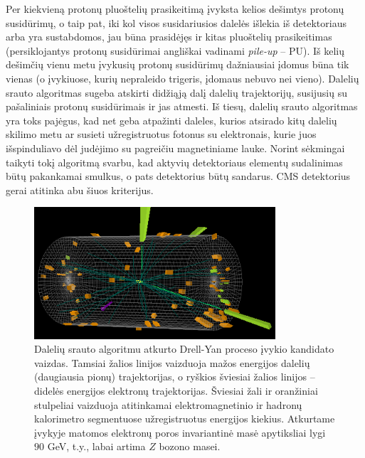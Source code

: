 \documentclass[a4paper, 12pt, oneside]{article}
\begin{document}
Per kiekvieną protonų pluoštelių prasikeitimą įvyksta kelios dešimtys protonų susidūrimų, o taip pat, iki kol
visos susidariusios dalelės išlekia iš detektoriaus arba yra sustabdomos, jau būna prasidėjęs ir kitas pluoštelių
prasikeitimas (persiklojantys protonų susidūrimai angliškai vadinami \textit{pile-up} -- PU).
Iš kelių dešimčių vienu metu įvykusių protonų susidūrimų dažniausiai įdomus būna tik vienas (o įvykiuose, kurių
nepraleido trigeris, įdomaus nebuvo nei vieno).
Dalelių srauto algoritmas sugeba atskirti didžiąją dalį dalelių trajektorijų, susijusių su pašaliniais
protonų susidūrimais ir jas atmesti.
Iš tiesų, dalelių srauto algoritmas yra toks pajėgus, kad net geba atpažinti daleles, kurios atsirado kitų dalelių skilimo metu
ar susieti užregistruotus fotonus su elektronais, kurie juos išspinduliavo dėl judėjimo su pagreičiu magnetiniame lauke.
Norint sėkmingai taikyti tokį algoritmą svarbu, kad aktyvių detektoriaus elementų sudalinimas būtų pakankamai smulkus,
o pats detektorius būtų sandarus.
CMS detektorius gerai atitinka abu šiuos kriterijus.

\begin{figure}[t]
	\includegraphics[width=0.8\textwidth]{Event.png}
	\caption{\label{fig:Event}
		Dalelių srauto algoritmu atkurto Drell-Yan proceso įvykio kandidato vaizdas.
		Tamsiai žalios linijos vaizduoja mažos energijos dalelių (daugiausia pionų) trajektorijas,
		o ryškios šviesiai žalios linijos -- didelės energijos elektronų trajektorijas.
		Šviesiai žali ir oranžiniai stulpeliai vaizduoja atitinkamai elektromagnetinio ir hadronų kalorimetro
		segmentuose užregistruotus energijos kiekius.
		Atkurtame įvykyje matomos elektronų poros invariantinė masė apytiksliai lygi $90$ GeV, t.y., labai artima $Z$ bozono masei.
	}
\end{figure}
\end{document}
